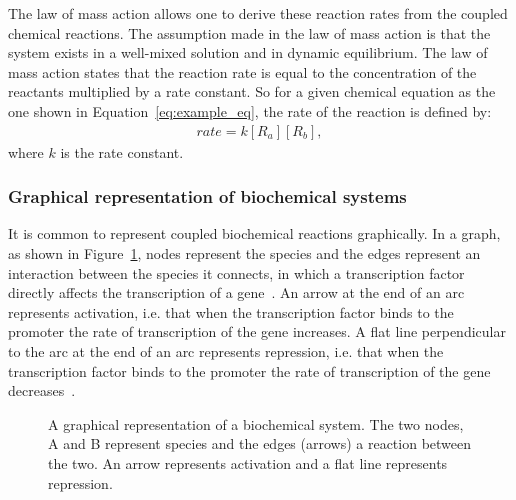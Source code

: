 The law of mass action allows one to derive these reaction rates from the coupled chemical reactions. The assumption made in the law of mass action is that the system exists in a well-mixed solution and in dynamic equilibrium. The law of mass action states that the reaction rate is equal to the concentration of the reactants multiplied by a rate constant. So for a given chemical equation as the one shown in Equation~\ref{eq:example_eq}, the rate of the reaction is defined by:
\begin{align*}
	rate = k[R_a][R_b],
\end{align*}
\noindent where $k$ is the rate constant.


\subsubsection{Graphical representation of biochemical systems}

It is common to represent coupled biochemical reactions graphically. In a graph, as shown in Figure~\ref{fig:Toggle_switch_example}, nodes represent the species and the edges represent an interaction between the species it connects, in which a transcription factor directly affects the transcription of a gene~\autocite{Alon:2007}. An arrow at the end of an arc represents activation, i.e. that when the transcription factor binds to the promoter the rate of transcription of the gene increases. A flat line perpendicular to the arc at the end of an arc represents repression, i.e. that when the transcription factor binds to the promoter the rate of transcription of the gene decreases~\autocite{Alon:2007}.

\begin{figure}[h!]
\begin{center}
\caption[A graphical representation of a biochemical system]{A graphical representation of a biochemical system. The two nodes, A and B represent species and the edges (arrows) a reaction between the two. An arrow represents activation and a flat line represents repression.}
\label{fig:Toggle_switch_example}
\end{center}

\end{figure}	



